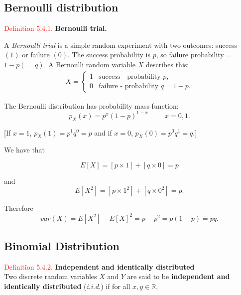 \documentclass[
]{book}
\begin{document}
\hypertarget{rv:Bernoulli:bern}{%
\subsection{Bernoulli distribution}\label{rv:Bernoulli:bern}}

\leavevmode{}%
\textcolor{red}{Definition 5.4.1.}
{\textbf{Bernoulli trial.}}

A \emph{Bernoulli trial} is a simple random experiment with two outcomes: success \((1)\) or failure \((0)\). The success probability is \(p\), so failure probability = \(1-p (=q)\).
A Bernoulli random variable \(X\) describes this:\\

\begin{eqnarray*}
X =
\left\{
\begin{array}{ll}
1 & \mbox{success - probability $p$}, \\
0 & \mbox{failure - probability $q=1-p$.}
\end{array}
\right.
\end{eqnarray*}

The Bernoulli distribution has probability mass function:\\

\[ p_X (x) = p^x (1-p)^{1-x} \hspace{1cm} x=0,1. \]

{[}If \(x =1\),
\(p_X (1) = p^1 q^0 = p\) and if \(x=0\), \(p_X (0) = p^0 q^1 = q\).{]}

We have that

\[
E[X]= [p \times 1] + [q \times 0] = p
\]

and\\

\[
E[X^{2}] = [p \times 1^{2}] + [q \times 0^{2}] = p.
\]

Therefore\\

\[
var (X) = E[X^{2}] - E[X]^{2} = p - p^{2} = p(1-p) =pq.
\]

\hypertarget{rv:Bernoulli:bin}{%
\subsection{Binomial Distribution}\label{rv:Bernoulli:bin}}

\hypertarget{rv:def:iid}{}
\textcolor{red}{Definition 5.4.2.}
{\textbf{Independent and identically distributed}}\\
Two discrete random variables \(X\) and \(Y\) are said to be \textbf{independent and
identically distributed} (\emph{i.i.d.}) if for all \(x, y \in \mathbb{R}\),\\
\end{document}

